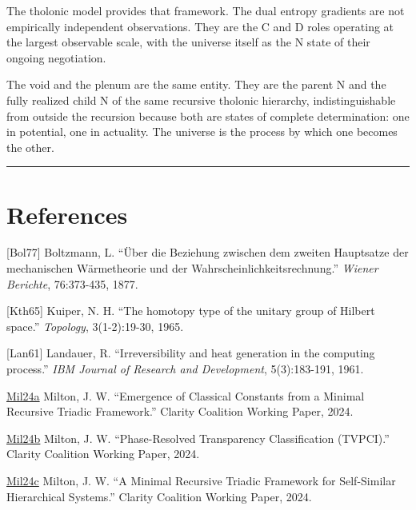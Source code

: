 \documentclass[12pt]{article}
\begin{document}
The tholonic model provides that framework. The dual entropy gradients
are not empirically independent observations. They are the C and D roles
operating at the largest observable scale, with the universe itself as
the N state of their ongoing negotiation.

The void and the plenum are the same entity. They are the parent N and
the fully realized child N of the same recursive tholonic hierarchy,
indistinguishable from outside the recursion because both are states of
complete determination: one in potential, one in actuality. The universe
is the process by which one becomes the other.

\begin{center}\rule{0.5\linewidth}{0.5pt}\end{center}

\section{References}\label{references}

{[}Bol77{]} Boltzmann, L. ``Über die Beziehung zwischen dem zweiten
Hauptsatze der mechanischen Wärmetheorie und der
Wahrscheinlichkeitsrechnung.'' \emph{Wiener Berichte}, 76:373-435, 1877.

{[}Kth65{]} Kuiper, N. H. ``The homotopy type of the unitary group of
Hilbert space.'' \emph{Topology}, 3(1-2):19-30, 1965.

{[}Lan61{]} Landauer, R. ``Irreversibility and heat generation in the
computing process.'' \emph{IBM Journal of Research and Development},
5(3):183-191, 1961.

\href{https://github.com/baardev/truevalue/blob/main/docnav/Research/papers/1_recursive-tholonic-five-constants/1_recursive-tholonic-five-constants.pdf}{Mil24a}
Milton, J. W. ``Emergence of Classical Constants from a Minimal
Recursive Triadic Framework.'' Clarity Coalition Working Paper, 2024.

\href{https://github.com/baardev/truevalue/blob/main/docnav/Research/papers/2_supply-chain-transparency-tvpci/2_supply-chain-transparency-tvpci.pdf}{Mil24b}
Milton, J. W. ``Phase-Resolved Transparency Classification (TVPCI).''
Clarity Coalition Working Paper, 2024.

\href{https://github.com/baardev/truevalue/blob/main/docnav/Research/papers/3_minimal-recursive-triadic-framework/3_minimal-recursive-triadic-framework.pdf}{Mil24c}
Milton, J. W. ``A Minimal Recursive Triadic Framework for Self-Similar
Hierarchical Systems.'' Clarity Coalition Working Paper, 2024.
\end{document}
